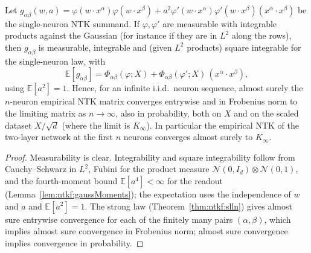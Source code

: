 \begin{theorem}\label{thm:ntktl:ntkLLN}
  \leanok
Let $g_{\alpha\beta}(w,a)=\varphi(w\cdot x^\alpha)\varphi(w\cdot x^\beta)+a^2\varphi'(w\cdot x^\alpha)\varphi'(w\cdot x^\beta)(x^\alpha\cdot x^\beta)$ be the single-neuron NTK summand. If $\varphi,\varphi'$ are measurable with integrable products against the Gaussian
(for instance if they are in $L^2$ along the rows), then $g_{\alpha\beta}$ is measurable, integrable and (given $L^2$ products) square integrable for the single-neuron law, with
\[
  \mathbb E[g_{\alpha\beta}]=\Phi_{\alpha\beta}(\varphi;X)+\Phi_{\alpha\beta}(\varphi';X)\,(x^\alpha\cdot x^\beta),
\]
using $\mathbb E[a^2]=1$. Hence, for an infinite i.i.d.\ neuron sequence, almost surely the $n$-neuron empirical NTK matrix converges entrywise and in Frobenius norm to the limiting matrix as $n\to\infty$, also in probability, both on
$X$ and on the scaled dataset $X/\sqrt d$ (where the limit is $K_\infty$). In particular the empirical NTK of the two-layer network at the first $n$ neurons converges almost surely to $K_\infty$.
\end{theorem}

\begin{proof}
  \leanok
Measurability is clear. Integrability and square integrability follow from Cauchy--Schwarz in $L^2$, Fubini for the product measure $\mathcal N(0,I_d)\otimes\mathcal N(0,1)$, and the fourth-moment bound
$\mathbb E[a^4]<\infty$ for the readout (Lemma~\ref{lem:ntkf:gaussMoments}); the expectation uses the independence of $w$ and $a$ and $\mathbb E[a^2]=1$.
The strong law (Theorem~\ref{thm:ntkf:slln}) gives almost sure entrywise convergence for each of the finitely many pairs $(\alpha,\beta)$, which implies almost sure convergence in Frobenius norm; almost sure convergence implies convergence in probability.
\end{proof}

